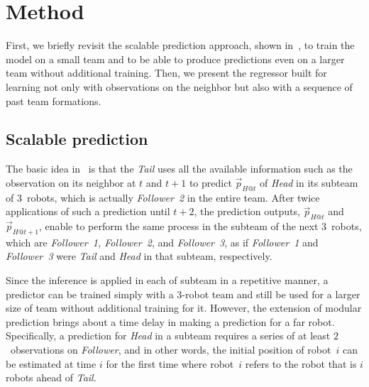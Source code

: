 \documentclass[letterpaper, 10 pt, conference]{ieeeconf}  %
\begin{document}


	\section{Method}
	\label{sec:method}

	First, we briefly revisit the scalable prediction approach, shown in~\cite{CPR17},
	to train the model on a small team and to be able to produce predictions
	even on a larger team without additional training.
	Then, we present the regressor built for learning not only with observations on
	the neighbor but also with a sequence of past team formations.


	\subsection{Scalable prediction}
	\label{sec:scalable_prediction}

	The basic idea in~\cite{CPR17} is that the \emph{Tail} uses all the available information
	such as the observation on its neighbor
	at $t$ and $t+1$ to predict $\vec{p}_{H@t}$ of \emph{Head} in its subteam of $3$~robots,
	which is actually \emph{Follower~2} in the entire team.
	After twice applications of such a prediction until $t+2$, the prediction outputs,
	$\vec{p}_{H@t}$ and $\vec{p}_{H@t+1}$, enable
	to perform the same process in the subteam of the next $3$~robots, which are
	\emph{Follower~1, Follower~2}, and \emph{Follower~3}, as if \emph{Follower~1} and
	\emph{Follower~3} were \emph{Tail} and \emph{Head} in that subteam, respectively.

	Since the inference is applied in each of subteam in a repetitive manner,
	a predictor can be trained simply with a $3$-robot team and still be used for a larger
	size of team without additional training for it. However, the extension of
	modular prediction brings about a time delay in making a prediction for a far robot.
	Specifically, a prediction for \emph{Head} in a subteam requires a series of at least
	$2$~observations on \emph{Follower}, and in other words,
	the initial position of robot~$i$ can be estimated at time $i$ for the first time
	where robot~$i$ refers to the robot that is $i$ robots ahead of \emph{Tail}.
\end{document}
